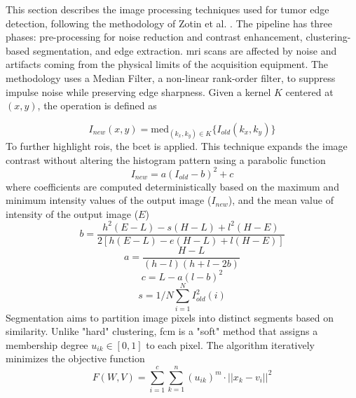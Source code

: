 This section describes the image processing techniques used for tumor edge detection, following the methodology of Zotin et al. \cite{zotin2018edge}. The pipeline has three phases: pre-processing for noise reduction and contrast enhancement, clustering-based segmentation, and edge extraction. \gls{mri} scans are affected by noise and artifacts coming from the physical limits of the acquisition equipment. The methodology uses a Median Filter, a non-linear rank-order filter, to suppress impulse noise while preserving edge sharpness. Given a kernel $K$ centered at $(x,y)$, the operation is defined as

\begin{equation}
    I_{new}(x,y) = \text{med}_{(k_x,k_y) \in K} \{ I_{old}(k_x,k_y) \}
\end{equation}
To further highlight \glspl{roi}, the \gls{bcet} is applied. This technique expands the image contrast without altering the histogram pattern \cite{zotin2018edge} using a parabolic function
\begin{equation}
    I_{new} = a(I_{old} - b)^2 + c
\end{equation}
where coefficients are computed deterministically based on the maximum and minimum intensity values of the output image ($I_{new}$), and the mean value of intensity of the output image ($E$)
\begin{equation}
b = \frac{h^2(E - L) - s(H - L) + l^2(H - E)}
{2[h(E - L) - e(H - L) + l(H - E)]}
\end{equation}
\begin{equation}
a = \frac{H - L}{(h - l)(h + l - 2b)}
\end{equation}
\begin{equation}
c = L - a(l - b)^2
\end{equation}
\begin{equation}
s = 1/N \sum_{i=1}^{N}I_{old}^2(i)
\end{equation}
Segmentation aims to partition image pixels into distinct segments based on similarity. Unlike "hard" clustering, \gls{fcm} \cite{bezdek1981pattern} is a "soft" method that assigns a membership degree $u_{ik} \in [0,1]$ to each pixel. The algorithm iteratively minimizes the objective function
\begin{equation}
    F(W,V) = \sum_{i=1}^{c} \sum_{k=1}^{n} (u_{ik})^m \cdot ||x_k - v_i||^2
\end{equation}
